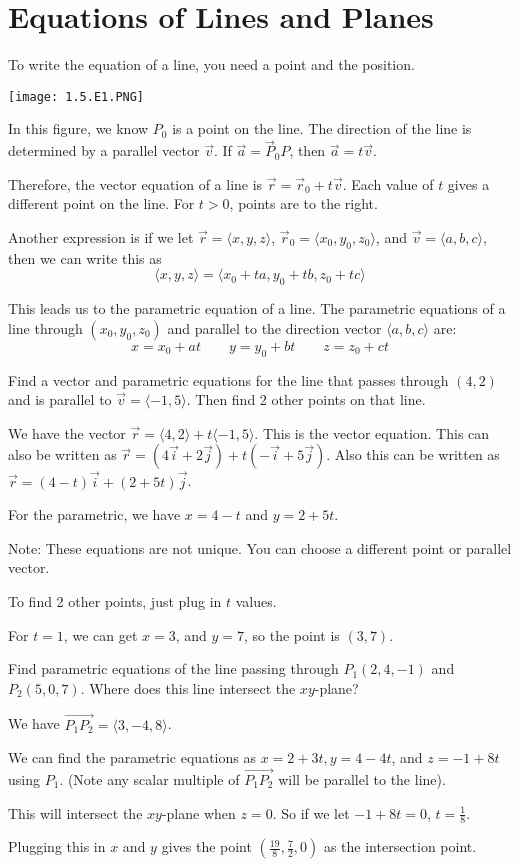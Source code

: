 \documentclass[../calc3.tex]{subfiles}
\begin{document}
\section{Equations of Lines and Planes}
To write the equation of a line, you need a point and the position.

\begin{center}
    \texttt{[image: 1.5.E1.PNG]}
\end{center}
In this figure, we know $P_0$ is a point on the line. The direction of the line is determined by a parallel vector $\vec{v}$. If $\vec{a}=\vec{P}_0P$, then $\vec{a}=t\vec{v}$.

Therefore, the vector equation of a line is $\vec{r}=\vec{r}_0+t\vec{v}$. Each value of $t$ gives a different point on the line. For $t>0$, points are to the right.

Another expression is if we let $\vec{r}=\langle x,y,z\rangle$, $\vec{r}_0=\langle x_0,y_0,z_0\rangle$, and $\vec{v}=\langle a,b,c\rangle$, then we can write this as 
\[ \langle x,y,z \rangle = \langle x_0+ta, y_0+tb, z_0+tc\rangle \]

This leads us to the parametric equation of a line. The parametric equations of a line through $(x_0,y_0,z_0)$ and parallel to the direction vector $\langle a,b,c\rangle$ are:
\[ x=x_0+at \qquad y=y_0+bt \qquad z=z_0+ct \]

\begin{example}
    Find a vector and parametric equations for the line that passes through $(4,2)$ and is parallel to $\vec{v}=\langle -1,5\rangle$. Then find 2 other points on that line.

    We have the vector $\vec{r}=\langle 4,2\rangle + t\langle -1,5\rangle$. This is the vector equation. This can also be written as $\vec{r}=(4\vec{i}+2\vec{j})+t(-\vec{i}+5\vec{j})$.
    Also this can be written as $\vec{r}=(4-t)\vec{i}+(2+5t)\vec{j}$. 

    For the parametric, we have $x=4-t$ and $y=2+5t$.

    Note: These equations are not unique. You can choose a different point or parallel vector.

    To find 2 other points, just plug in $t$ values.

    For $t=1$, we can get $x=3$, and $y=7$, so the point is $(3,7)$.
\end{example}

\begin{example}
    Find parametric equations of the line passing through $P_1(2,4,-1)$ and $P_2(5,0,7)$. Where does this line intersect the $xy$-plane?

    We have $\overrightarrow{P_1P_2}=\langle 3,-4,8\rangle$.

    We can find the parametric equations as $x=2+3t, y=4-4t$, and $z=-1+8t$ using $P_1$. (Note any scalar multiple of $\overrightarrow{P_1P_2}$ will be parallel to the line).

    This will intersect the $xy$-plane when $z=0$. So if we let $-1+8t=0$, $t=\frac{1}{8}$.

    Plugging this in $x$ and $y$ gives the point $\left(\frac{19}{8},\frac{7}{2},0\right)$ as the intersection point.
\end{example}
\end{document}
